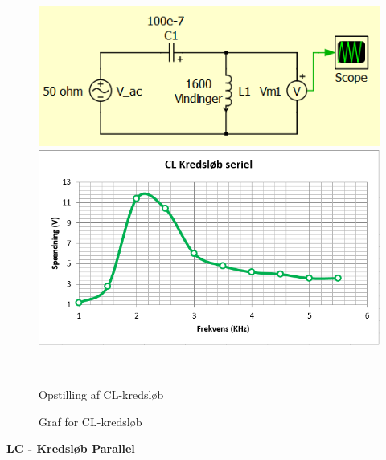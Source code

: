 \begin{figure}[H]
	\centering
	\begin{minipage}[b]{0.48\textwidth}
	\centering
	\includegraphics[width=1\textwidth]{Vildledning/Schematics/kredslb/CL_serie} %
	\end{minipage}
	\hfill
	\begin{minipage}[b]{0.48\textwidth}
	\centering
	\includegraphics[width=1\textwidth]{Setup/Graf4} %
	\end{minipage}
	\\ %
	\begin{minipage}[t]{0.48\textwidth}
	\caption{Opstilling af CL-kredsløb} %
	\end{minipage}
	\hfill
	\begin{minipage}[t]{0.48\textwidth}
	\caption{Graf for CL-kredsløb} %
	\end{minipage}
\end{figure}

\textbf{LC - Kredsløb Parallel}


